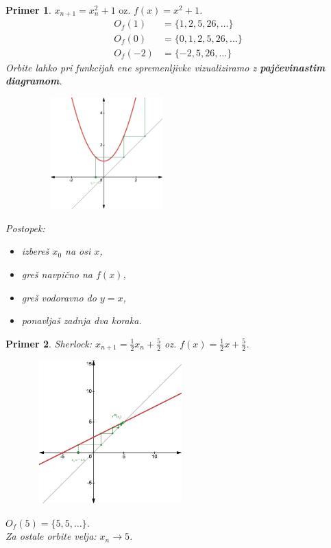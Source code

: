 \documentclass{article}
\newtheorem{primer}{Primer}
\begin{document}
\begin{primer}
$x_{n+1} = x_n^2 + 1 \text{ oz. } f(x) = x^2 + 1$.
\begin{align*}
O_f(1) &= \{1, 2, 5, 26, \dots\} \\ 
O_f(0) &= \{0, 1, 2, 5, 26, \dots\}\\
O_f(-2) &= \{-2, 5, 26, \dots \}
\end{align*}
Orbite lahko pri funkcijah ene spremenljivke vizualiziramo z \textbf{pajčevinastim diagramom}.

\begin{figure}[h]
\begin{center}
    \includegraphics[width=5.7cm, height=4.3cm]{Grafi/cobweb1.png}
\end{center}
\end{figure}

\newpage
Postopek:
\begin{itemize}
\item izbereš $x_0$ na osi $x$,
\item greš navpično na $f(x)$,
\item greš vodoravno do $y = x$,
\item ponavljaš zadnja dva koraka.
\end{itemize}
\end{primer}


\begin{primer}
Sherlock: $x_{n+1} = \frac{1}{2} x_n + \frac{5}{2}$ oz. $f(x) = \frac{1}{2} x + \frac{5}{2}$.\\ 

\begin{figure}[h]
    \begin{center}
   \includegraphics[width=6cm, height=5.5cm]{Grafi/cobweb2.png}
    \end{center}
\end{figure}
 \noindent   
$O_f(5) = \{5, 5, \dots \}$.\\
Za ostale orbite velja: $x_n \rightarrow 5$.
\end{primer}
\end{document}
